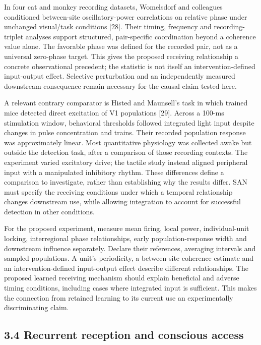 \documentclass[
  american,
  11pt,
  letterpaper,
]{article}
\begin{document}
In four cat and monkey recording datasets, Womelsdorf and colleagues conditioned between-site oscillatory-power correlations on relative phase under unchanged visual/task conditions {[}28{]}. Their timing, frequency and recording-triplet analyses support structured, pair-specific coordination beyond a coherence value alone. The favorable phase was defined for the recorded pair, not as a universal zero-phase target. This gives the proposed receiving relationship a concrete observational precedent; the statistic is not itself an intervention-defined input-output effect. Selective perturbation and an independently measured downstream consequence remain necessary for the causal claim tested here.

A relevant contrary comparator is Histed and Maunsell's task in which trained mice detected direct excitation of V1 populations {[}29{]}. Across a 100-ms stimulation window, behavioral thresholds followed integrated light input despite changes in pulse concentration and trains. Their recorded population response was approximately linear. Most quantitative physiology was collected awake but outside the detection task, after a comparison of those recording contexts. The experiment varied excitatory drive; the tactile study instead aligned peripheral input with a manipulated inhibitory rhythm. These differences define a comparison to investigate, rather than establishing why the results differ. SAN must specify the receiving conditions under which a temporal relationship changes downstream use, while allowing integration to account for successful detection in other conditions.

For the proposed experiment, measure mean firing, local power, individual-unit locking, interregional phase relationships, early population-response width and downstream influence separately. Declare their references, averaging intervals and sampled populations. A unit's periodicity, a between-site coherence estimate and an intervention-defined input-output effect describe different relationships. The proposed learned receiving mechanism should explain beneficial and adverse timing conditions, including cases where integrated input is sufficient. This makes the connection from retained learning to its current use an experimentally discriminating claim.

\subsection{3.4 Recurrent reception and conscious access}\label{recurrent-reception-and-conscious-access}
\end{document}
